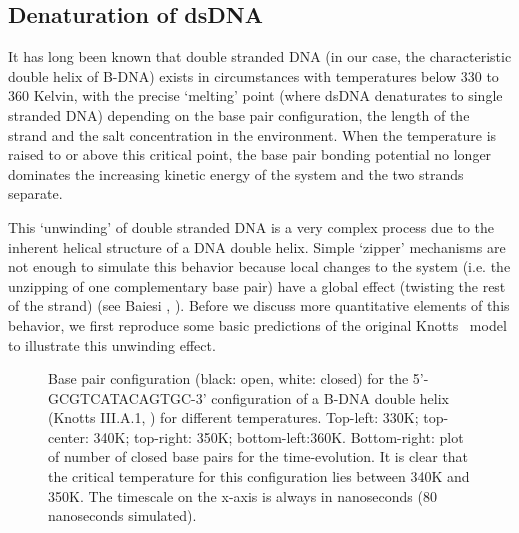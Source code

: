 \subsection{Denaturation of dsDNA}

It has long been known that double stranded DNA (in our case, the characteristic double helix of B-DNA) exists in circumstances with temperatures below 330 to 360 Kelvin, with the precise `melting' point (where dsDNA denaturates to single stranded DNA) depending on the base pair configuration, the length of the strand and the salt concentration in the environment.
When the temperature is raised to or above this critical point, the base pair bonding potential no longer dominates the increasing kinetic energy of the system and the two strands separate. 

This `unwinding' of double stranded DNA is a very complex process due to the inherent helical structure of a DNA double helix.
Simple `zipper' mechanisms are not enough to simulate this behavior because local changes to the system (i.e. the unzipping of one complementary base pair) have a global effect (twisting the rest of the strand) (see Baiesi \etal, \cite{carlon2010unwinding}).
Before we discuss more quantitative elements of this behavior, we first reproduce some basic predictions of the original Knotts \etal\ model \cite{knotts2007coarse} to illustrate this unwinding effect.


\begin{figure}[hbt] \begin{minipage}{4.5cm}
 \end{minipage} \begin{minipage}{4.5cm}  \end{minipage}
\begin{minipage}{4cm}
 \end{minipage}
\begin{center}
\begin{minipage}{6cm}\end{minipage}
\begin{minipage}{6cm}\end{minipage}
\caption{Base pair configuration (black: open, white: closed) for the 5'-GCGTCATACAGTGC-3' configuration of a B-DNA double helix (Knotts III.A.1, \cite{knotts2007coarse}) for different temperatures. Top-left: 330K; top-center: 340K; top-right: 350K; bottom-left:360K. Bottom-right: plot of number of closed base pairs for the time-evolution. It is clear that the critical temperature for this configuration lies between 340K and 350K. The timescale on the x-axis is always in nanoseconds (80 nanoseconds simulated).  } \label{knotts1_configs}\end{center}
\end{figure}


